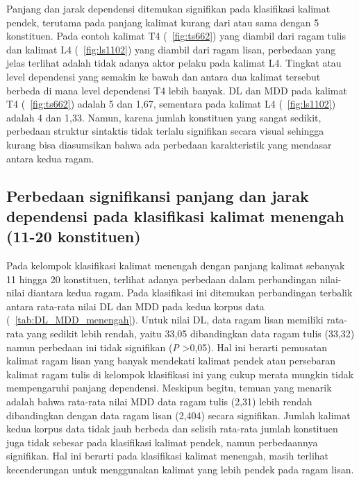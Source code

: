 Panjang dan jarak dependensi ditemukan signifikan pada klasifikasi kalimat pendek, terutama pada panjang kalimat kurang dari atau sama dengan 5 konstituen. Pada contoh kalimat T4 (\pic~\ref{fig:ts662}) yang diambil dari ragam tulis dan kalimat L4 (\pic~\ref{fig:ls1102}) yang diambil dari ragam lisan, perbedaan yang jelas terlihat adalah tidak adanya aktor pelaku pada kalimat L4. Tingkat atau level dependensi yang semakin ke bawah dan antara dua kalimat tersebut berbeda di mana level dependensi T4 lebih banyak. DL dan MDD pada kalimat T4 (\pic~\ref{fig:ts662}) adalah 5 dan 1,67, sementara pada kalimat L4 (\pic~\ref{fig:ls1102}) adalah 4 dan 1,33. Namun, karena jumlah konstituen yang sangat sedikit, perbedaan struktur sintaktis tidak terlalu signifikan secara visual sehingga kurang bisa diasumsikan bahwa ada perbedaan karakteristik yang mendasar antara kedua ragam. 

\subsection{Perbedaan signifikansi panjang dan jarak dependensi pada klasifikasi kalimat menengah (11-20 konstituen)}
Pada kelompok klasifikasi kalimat menengah dengan panjang kalimat sebanyak 11 hingga 20 konstituen, terlihat adanya perbedaan dalam perbandingan nilai-nilai diantara kedua ragam. Pada klasifikasi ini ditemukan perbandingan terbalik antara rata-rata nilai DL dan MDD pada kedua korpus data (\tab~\ref{tab:DL_MDD_menengah}). Untuk nilai DL, data ragam lisan memiliki rata-rata yang sedikit lebih rendah, yaitu 33,05 dibandingkan data ragam tulis (33,32) namun perbedaan ini tidak signifikan (\textit{P} \textgreater 0,05). Hal ini berarti pemusatan kalimat ragam lisan yang banyak mendekati kalimat pendek atau persebaran kalimat ragam tulis di kelompok klasifikasi ini yang cukup merata mungkin tidak mempengaruhi panjang dependensi. Meskipun begitu, temuan yang menarik adalah bahwa rata-rata nilai MDD data ragam tulis (2,31) lebih rendah dibandingkan dengan data ragam lisan (2,404) secara signifikan. Jumlah kalimat kedua korpus data tidak jauh berbeda dan selisih rata-rata jumlah konstituen juga tidak sebesar pada klasifikasi kalimat pendek, namun perbedaannya signifikan. Hal ini berarti pada klasifikasi kalimat menengah, masih terlihat kecenderungan untuk menggunakan kalimat yang lebih pendek pada ragam lisan.  

